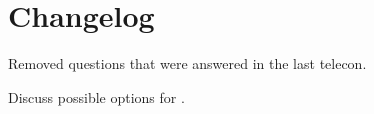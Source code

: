 \section{Changelog}
\begin{revision}
  \item Removed questions that were answered in the last telecon.
  \item Discuss possible options for .
\end{revision}
